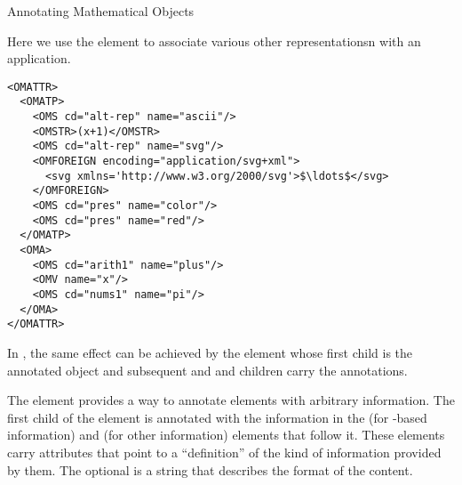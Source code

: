 \begin{omgroup}[id=annotating]{Annotating Mathematical Objects}
\begin{example}[id=omattr.ex]
  Here we use the  element to associate various other
  representationsn with an application.
\begin{lstlisting}[language=OpenMath,label=lst:omattr,mathescape,
                   caption={Associating Alternate Representations with an
                   {\openmath} Object},
                   numbers=none,index={OMATTR,OMATP}]
<OMATTR>
  <OMATP>
    <OMS cd="alt-rep" name="ascii"/>
    <OMSTR>(x+1)</OMSTR>
    <OMS cd="alt-rep" name="svg"/>
    <OMFOREIGN encoding="application/svg+xml">
      <svg xmlns='http://www.w3.org/2000/svg'>$\ldots$</svg>
    </OMFOREIGN>
    <OMS cd="pres" name="color"/>
    <OMS cd="pres" name="red"/>
  </OMATP>
  <OMA>
    <OMS cd="arith1" name="plus"/>
    <OMV name="x"/>
    <OMS cd="nums1" name="pi"/>
  </OMA>
</OMATTR>
\end{lstlisting}
\end{example}

In \cmathml, the same effect can be achieved by the  element
whose first child is the annotated object and subsequent 
and  and children carry the annotations.

\begin{definition}[id=semantics.def]
  The  element provides a way to annotate {\cmathml} elements
  with arbitrary information. The first child of the  element
  is annotated with the information in the {} (for
  {\xml}-based information) and {} (for other information)
  elements that follow it. These elements carry
   attributes that point to a
  ``definition'' of the kind of information provided by them. The optional
   is a string that describes the format of the
  content.
\end{definition}


\end{omgroup}
